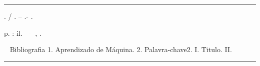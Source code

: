%
%     
\begin{fichacatalografica}
	\vspace*{\fill}					%
	\hrule							%
	\begin{center}					%
	\begin{minipage}[c]{12.5cm}		%
	
	\imprimirautorinverso
	
	\hspace{0.5cm} \imprimirtitulo. / \imprimirautor. --
	\imprimirlocal.- \imprimirano.
	
	\hspace{0.5cm} \pageref{LastPage} p. : il.
	\bigbreak
	\hspace{0.5cm} \imprimirtipotrabalho~--~\imprimirinstituicao, \imprimirano.

	\hspace{0.5cm} \imprimirorientadorRotulo~\imprimirorientador
	\bigbreak
	\hspace{0.5cm} Bibliografia
	\bigbreak
	\hspace{0.5cm}
		1. Aprendizado de Máquina.
		2. Palavra-chave2.
		I. Titulo.
		II. \imprimirinstituicao
	\bigbreak
	\end{minipage}
	\end{center}
	\hrule
\end{fichacatalografica}
